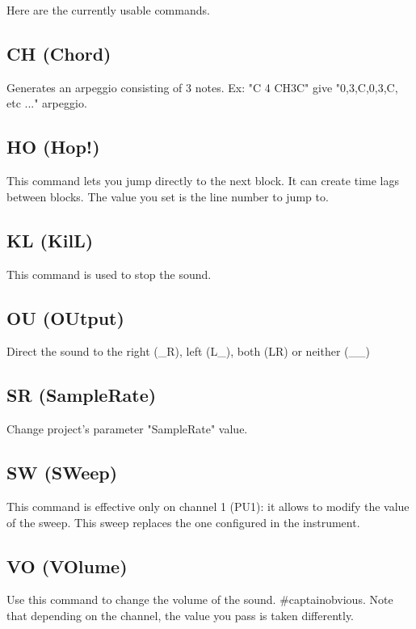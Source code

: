 
Here are the currently usable commands.

\subsection{CH (Chord)}


Generates an arpeggio consisting of 3 notes. Ex: "C 4 CH3C" give "0,3,C,0,3,C, etc ..." arpeggio.

\subsection{HO (Hop!)}

This command lets you jump directly to the next block.
It can create time lags between blocks.
The value you set is the line number to jump to.

\subsection{KL (KilL)}

This command is used to stop the sound.


\subsection{OU (OUtput)}

Direct the sound to the right (\_R), left (L\_), both (LR) or neither (\_\_)

\subsection{SR (SampleRate)}

Change project's parameter "SampleRate" value.

\subsection{SW (SWeep)}

This command is effective only on channel 1 (PU1): it allows to modify the value of the sweep.
This sweep replaces the one configured in the instrument.

\subsection{VO (VOlume)}

Use this command to change the volume of the sound.
\#captainobvious.
Note that depending on the channel, the value you pass is taken differently.
